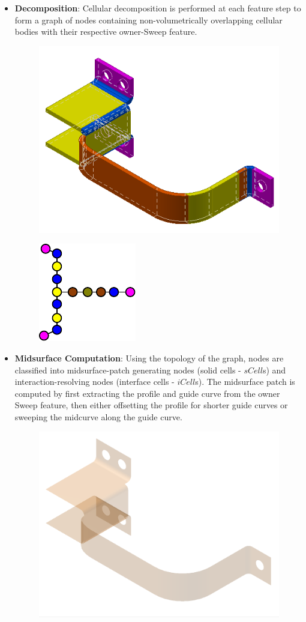 \begin{itemize}[noitemsep,topsep=2pt,parsep=2pt,partopsep=2pt,leftmargin=*]
\item \textbf{Decomposition}: Cellular decomposition is performed at each feature step to form a graph of nodes containing non-volumetrically overlapping cellular bodies with their respective owner-Sweep feature.

	\begin{figure}[ht]
	\centering 
	\includegraphics[width=0.5\linewidth]{images/CellularBracket}
	\label{fig_cd}
	\end{figure}
	
	\begin{figure}[ht]
	\centering 
	\includegraphics[width=0.4\linewidth]{images/CellGraphBracket.pdf}
	\label{fig_cg}
	\end{figure}	
	
\item \textbf{Midsurface Computation}: Using the topology of the graph, nodes are classified into midsurface-patch generating nodes (solid cells - $sCell$s) and interaction-resolving nodes (interface cells - $iCell$s). The midsurface patch is computed by first extracting the profile and guide curve from the owner Sweep feature, then either offsetting the profile for shorter guide curves or sweeping the midcurve \cite{YogeshETES2014,YogeshIJCAET2017} along the guide curve.

	\begin{figure}[ht]
	\centering 
	\includegraphics[width=0.5\linewidth]{images/MidsurfAfterDormant}
	\label{fig_mids}
	\end{figure}	
	

\end{itemize}

